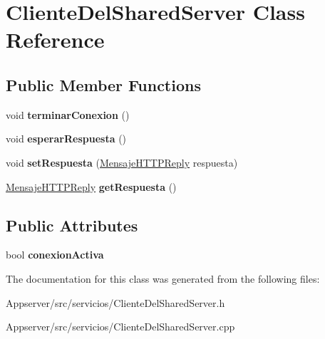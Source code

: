 \hypertarget{classClienteDelSharedServer}{}\section{Cliente\+Del\+Shared\+Server Class Reference}
\label{classClienteDelSharedServer}
\subsection*{Public Member Functions}
\begin{DoxyCompactItemize}
\item 
void {\bfseries terminar\+Conexion} ()\hypertarget{classClienteDelSharedServer_a0415748dddbce6487c6c0cd87e3fb74b}{}\label{classClienteDelSharedServer_a0415748dddbce6487c6c0cd87e3fb74b}

\item 
void {\bfseries esperar\+Respuesta} ()\hypertarget{classClienteDelSharedServer_aee5b2352c0442a2be3f960e25b16decf}{}\label{classClienteDelSharedServer_aee5b2352c0442a2be3f960e25b16decf}

\item 
void {\bfseries set\+Respuesta} (\hyperlink{classMensajeHTTPReply}{Mensaje\+H\+T\+T\+P\+Reply} respuesta)\hypertarget{classClienteDelSharedServer_ac7622c5d264740a6f3a493f6caf4e588}{}\label{classClienteDelSharedServer_ac7622c5d264740a6f3a493f6caf4e588}

\item 
\hyperlink{classMensajeHTTPReply}{Mensaje\+H\+T\+T\+P\+Reply} {\bfseries get\+Respuesta} ()\hypertarget{classClienteDelSharedServer_aaede794b78c3a7ddfc47b1779b189be0}{}\label{classClienteDelSharedServer_aaede794b78c3a7ddfc47b1779b189be0}

\end{DoxyCompactItemize}
\subsection*{Public Attributes}
\begin{DoxyCompactItemize}
\item 
bool {\bfseries conexion\+Activa}\hypertarget{classClienteDelSharedServer_a876ebf6d5ded0dfd3633552d6af8f9e4}{}\label{classClienteDelSharedServer_a876ebf6d5ded0dfd3633552d6af8f9e4}

\end{DoxyCompactItemize}


The documentation for this class was generated from the following files\+:\begin{DoxyCompactItemize}
\item 
Appserver/src/servicios/Cliente\+Del\+Shared\+Server.\+h\item 
Appserver/src/servicios/Cliente\+Del\+Shared\+Server.\+cpp\end{DoxyCompactItemize}
